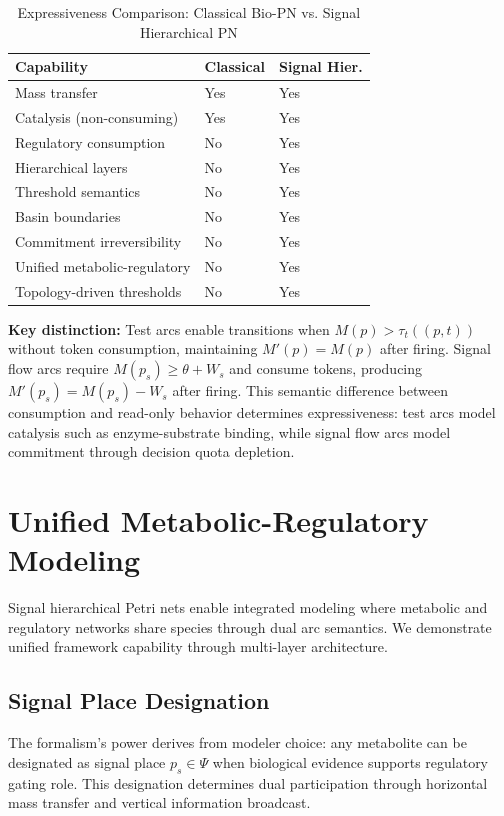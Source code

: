 \documentclass[10pt,letterpaper]{article}
\begin{document}
\begin{table}[h]
\centering
\small
\caption{Expressiveness Comparison: Classical Bio-PN vs. Signal Hierarchical PN}
\label{tab:comparison}
\begin{tabular}{p{5cm}p{2.5cm}p{2.5cm}}
\toprule
\textbf{Capability} & \textbf{Classical} & \textbf{Signal Hier.} \\
\midrule
Mass transfer & Yes & Yes \\
Catalysis (non-consuming) & Yes & Yes \\
Regulatory consumption & No & Yes \\
Hierarchical layers & No & Yes \\
Threshold semantics & No & Yes \\
Basin boundaries & No & Yes \\
Commitment irreversibility & No & Yes \\
Unified metabolic-regulatory & No & Yes \\
Topology-driven thresholds & No & Yes \\
\bottomrule
\end{tabular}
\end{table}

\textbf{Key distinction:} Test arcs enable transitions when $M(p) > \tau_t((p,t))$ without token consumption, maintaining $M'(p) = M(p)$ after firing. Signal flow arcs require $M(p_s) \geq \theta + W_s$ and consume tokens, producing $M'(p_s) = M(p_s) - W_s$ after firing. This semantic difference between consumption and read-only behavior determines expressiveness: test arcs model catalysis such as enzyme-substrate binding, while signal flow arcs model commitment through decision quota depletion.

\section{Unified Metabolic-Regulatory Modeling}

Signal hierarchical Petri nets enable integrated modeling where metabolic and regulatory networks share species through dual arc semantics. We demonstrate unified framework capability through multi-layer architecture.

\subsection{Signal Place Designation}

The formalism's power derives from modeler choice: any metabolite can be designated as signal place $p_s \in \Psi$ when biological evidence supports regulatory gating role. This designation determines dual participation through horizontal mass transfer and vertical information broadcast.
\end{document}
